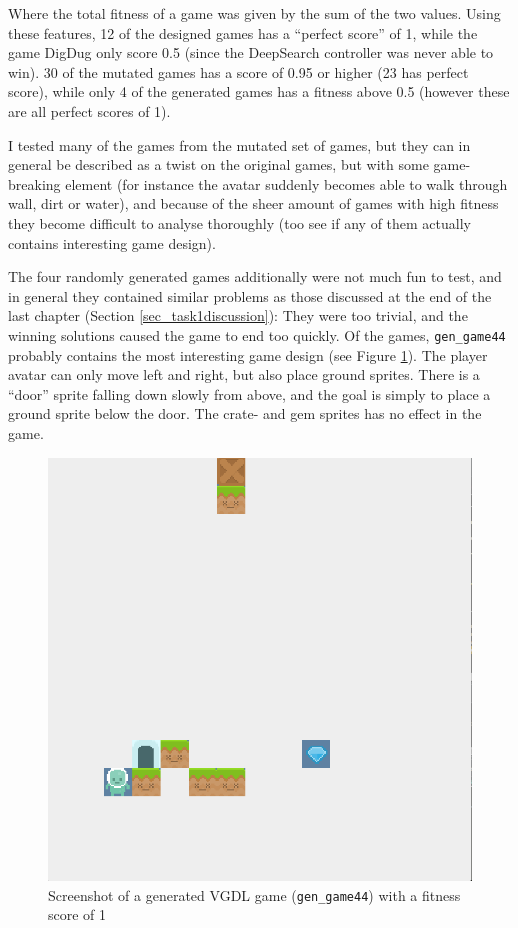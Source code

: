 \documentclass[a4paper,titlepage,final]{report}
\begin{document}
Where the total fitness of a game was given by the sum of the two values.
Using these features, 12 of the designed games has a ``perfect score'' of 1, while the game DigDug only score 0.5 (since the DeepSearch controller was never able to win).
30 of the mutated games has a score of 0.95 or higher (23 has perfect score), while only 4 of the generated games has a fitness above 0.5 (however these are all perfect scores of 1).

I tested many of the games from the mutated set of games, but they can in general be described as a twist on the original games, but with some game-breaking element (for instance the avatar suddenly becomes able to walk through wall, dirt or water), and because of the sheer amount of games with high fitness they become difficult to analyse thoroughly (too see if any of them actually contains interesting game design).

The four randomly generated games additionally were not much fun to test, and in general they contained similar problems as those discussed at the end of the last chapter (Section \ref{sec_task1discussion}): They were too trivial, and the winning solutions caused the game to end too quickly.
Of the games, \texttt{gen_game44} probably contains the most interesting game design (see Figure \ref{fig:gengame44}).
The player avatar can only move left and right, but also place ground sprites. 
There is a ``door'' sprite falling down slowly from above, and the goal is simply to place a ground sprite below the door.
The crate- and gem sprites has no effect in the game.

\begin{figure}[!ht]
\centering
\includegraphics[scale=0.24]{gengame44.png}
\caption{Screenshot of a generated VGDL game (\texttt{gen_game44}) with a fitness score of 1}
\label{fig:gengame44}
\end{figure}
\end{document}
